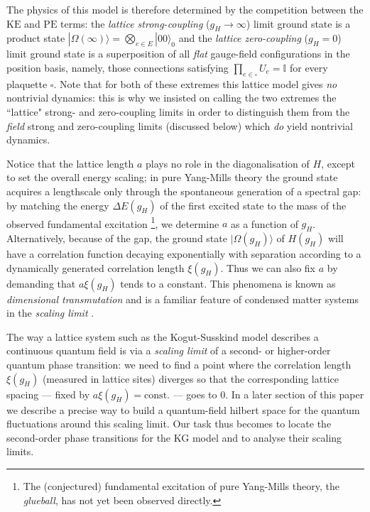 \documentclass[twocolumn,lengthcheck,superscriptaddress]{revtex4-1}
\theoremstyle{definition}
\theoremstyle{remark}
\begin{document}
The physics of this model is therefore determined by the competition between the $\text{KE}$ and $\text{PE}$ terms: the \emph{lattice strong-coupling} ($g_H\rightarrow \infty$) limit ground state is a product state $|\Omega(\infty)\rangle = \bigotimes_{e\in E} |00\rangle_0$ and the \emph{lattice zero-coupling} ($g_H=0$) limit ground state is a superposition of all \emph{flat} gauge-field configurations in the position basis, namely, those connections satisfying $\prod_{e\in \square} U_e = \mathbb{I}$ for every plaquette $\square$. Note that for both of these extremes this lattice model gives \emph{no} nontrivial dynamics: this is why we insisted on calling the two extremes the ``lattice" strong- and zero-coupling limits in order to distinguish them from the \emph{field} strong and zero-coupling limits (discussed below) which \emph{do} yield nontrivial dynamics.

Notice that the lattice length $a$ plays no role in the diagonalisation of $H$, except to set the overall energy scaling; in pure Yang-Mills theory the ground state acquires a lengthscale only through the spontaneous generation of a spectral gap:  by matching the energy $\Delta E(g_H)$ of the first excited state to the mass of the observed fundamental excitation \footnote{The (conjectured) fundamental excitation of pure Yang-Mills theory, the \emph{glueball}, has not yet been observed directly.}, we determine $a$ as a function of $g_H$. Alternatively, because of the gap, the ground state $|\Omega(g_H)\rangle$ of $H(g_H)$ will have a correlation function decaying exponentially with separation according to a dynamically generated correlation length $\xi(g_H)$. Thus we can also fix $a$ by demanding that $a\xi(g_H)$ tends to a constant. This phenomena is known as \emph{dimensional transmutation} and is a familiar feature of condensed matter systems in the \emph{scaling limit} \cite{sachdev:2011a}.

The way a lattice system such as the Kogut-Susskind model describes a continuous quantum field is via a \emph{scaling limit} of a second- or higher-order quantum phase transition: we need to find a point where the correlation length $\xi(g_H)$ (measured in lattice sites) diverges so that the corresponding lattice spacing --- fixed by $a\xi(g_H) = \text{const.}$ --- goes to $0$. In a later section of this paper we  describe a precise way to build a quantum-field hilbert space for the quantum fluctuations around this scaling limit. Our task thus becomes to locate the second-order phase transitions for the KG model and to analyse their scaling limits. 
\end{document}
